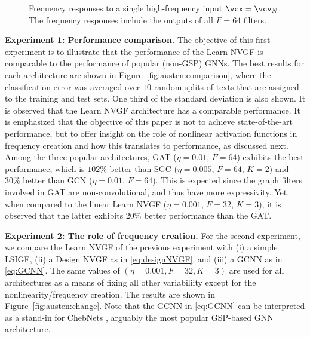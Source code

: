 \begin{figure*}
    \centering
    \hfill
    \hfill
    \caption{Frequency responses to a single high-frequency input $\vcx = \vcv_{N}$. The frequency responses include the outputs of all $F=64$ filters.%
    }
    \label{fig:austen:freq}
\end{figure*}

\textbf{Experiment 1: Performance comparison.} The objective of this first experiment is to illustrate that the performance of the Learn NVGF is comparable to the performance of popular (non-GSP) GNNs. The best results for each architecture are shown in Figure~\ref{fig:austen:comparison}, where the classification error was averaged over $10$ random splits of texts that are assigned to the training and test sets. One third of the standard deviation is also shown. It is observed that the Learn NVGF architecture has a comparable performance. It is emphasized that the objective of this paper is not to achieve state-of-the-art performance, but to offer insight on the role of nonlinear activation functions in frequency creation and how this translates to performance, as discussed next.
\else
Among the three popular architectures, GAT ($\eta = 0.01$, $F=64$) exhibits the best performance, which is $102\%$ better than SGC ($\eta = 0.005$, $F=64$, $K=2$) and $30\%$ better than GCN ($\eta = 0.01$, $F=64$). This is expected since the graph filters involved in GAT are non-convolutional, and thus have more expressivity. Yet, when compared to the linear Learn NVGF ($\eta=0.001$, $F=32$, $K=3$), it is observed that the latter exhibits $20\%$ better performance than the GAT.
\fi

\textbf{Experiment 2: The role of frequency creation.} For the second experiment, we compare the Learn NVGF of the previous experiment with (i) a simple LSIGF, (ii) a Design NVGF as in \eqref{eq:designNVGF}, and (iii) a GCNN as in \eqref{eq:GCNN}. The same values of $(\eta=0.001, F=32, K=3)$ are used for all architectures as a means of fixing all other variabiliity except for the nonlinearity/frequency creation. The results are shown in Figure~\ref{fig:austen:change}. Note that the GCNN in \eqref{eq:GCNN} can be interpreted as a stand-in for ChebNets \cite{Defferrard2016-ChebNets}, arguably the most popular GSP-based GNN architecture.

